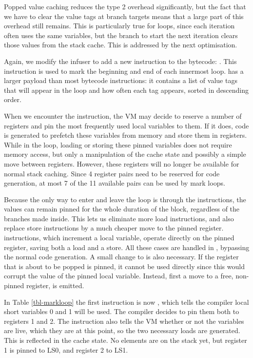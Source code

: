 Popped value caching reduces the type 2 overhead significantly, but the fact that we have to clear the value tags at branch targets means that a large part of this overhead still remains. This is particularly true for loops, since each iteration often uses the same variables, but the branch to start the next iteration clears those values from the stack cache. This is addressed by the next optimisation.

Again, we modify the infuser to add a new instruction to the bytecode: . This instruction is used to mark the beginning and end of each innermost loop.  has a larger payload than most bytecode instructions: it contains a list of value tags that will appear in the loop and how often each tag appears, sorted in descending order.

When we encounter the  instruction, the VM may decide to reserve a number of registers and pin the most frequently used local variables to them. If it does, code is generated to prefetch these variables from memory and store them in registers. While in the loop, loading or storing these pinned variables does not require memory access, but only a manipulation of the cache state and possibly a simple move between registers. However, these registers will no longer be available for normal stack caching. Since 4 register pairs need to be reserved for code generation, at most 7 of the 11 available pairs can be used by mark loops.

Because the only way to enter and leave the loop is through the  instructions, the values can remain pinned for the whole duration of the block, regardless of the branches made inside. This lets us eliminate more load instructions, and also replace store instructions by a much cheaper move to the pinned register.  instructions, which increment a local variable, operate directly on the pinned register, saving both a load and a store. All these cases are handled in , bypassing the normal code generation. A small change to  is also necessary. If the register that is about to be popped is pinned, it cannot be used directly since this would corrupt the value of the pinned local variable. Instead, first a move to a free, non-pinned register, is emitted.

In Table \ref{tbl-markloop} the first instruction is now , which tells the compiler local short variables 0 and 1 will be used. The compiler decides to pin them both to registers 1 and 2. The  instruction also tells the VM whether or not the variables are live, which they are at this point, so the two necessary loads are generated. This is reflected in the cache state. No elements are on the stack yet, but register 1 is pinned to LS0, and register 2 to LS1.

